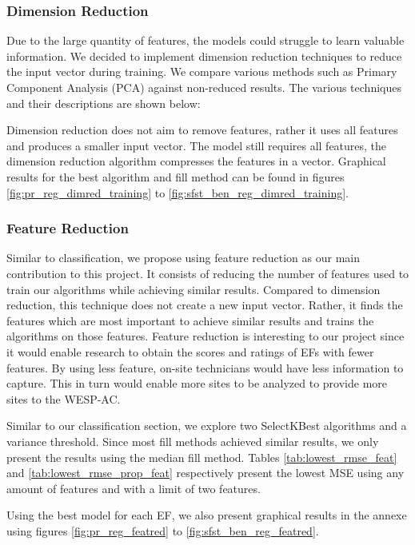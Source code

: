 \documentclass[12pt,letterpaper]{article}
\begin{document}
\subsubsection{Dimension Reduction}
Due to the large quantity of features, the models could struggle to learn valuable information.
We decided to implement dimension reduction techniques to reduce the input vector during training.
We compare various methods such as Primary Component Analysis (PCA) against non-reduced results.
The various techniques and their descriptions are shown below:

Dimension reduction does not aim to remove features, rather it uses all features and produces a smaller input vector.
The model still requires all features, the dimension reduction algorithm compresses the features in a vector.
Graphical results for the best algorithm and fill method can be found in figures \ref{fig:pr_reg_dimred_training} to \ref{fig:sfst_ben_reg_dimred_training}.



\subsubsection{Feature Reduction}
Similar to classification, we propose using feature reduction as our main contribution to this project.
It consists of reducing the number of features used to train our algorithms while achieving similar results.
Compared to dimension reduction, this technique does not create a new input vector.
Rather, it finds the features which are most important to achieve similar results and trains the algorithms on those features.
Feature reduction is interesting to our project since it would enable research to obtain the scores and ratings of \ac{EF}s with fewer features.
By using less feature, on-site technicians would have less information to capture.
This in turn would enable more sites to be analyzed to provide more sites to the WESP-AC.

Similar to our classification section, we explore two SelectKBest algorithms and a variance threshold.
Since most fill methods achieved similar results, we only present the results using the median fill method.
Tables \ref{tab:lowest_rmse_feat} and \ref{tab:lowest_rmse_prop_feat} respectively present the lowest MSE using any amount of features and with a limit of two features.


Using the best model for each \ac{EF}, we also present graphical results in the annexe using figures \ref{fig:pr_reg_featred} to \ref{fig:sfst_ben_reg_featred}.
\end{document}
